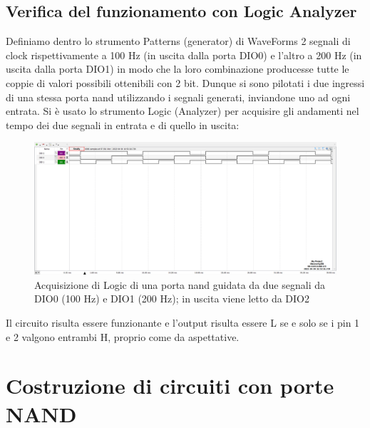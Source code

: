 \documentclass[10pt, a4paper, italian]{article}
\begin{document}
\subsection{Verifica del funzionamento con Logic Analyzer}
Definiamo dentro lo strumento Patterns (generator) di WaveForms 2 segnali
di clock rispettivamente a 100 Hz (in uscita dalla porta DIO0) e l'altro a 200 Hz (in uscita dalla porta DIO1) in modo che la loro combinazione producesse tutte le coppie di valori possibili ottenibili con 2 bit.
Dunque si sono pilotati i due ingressi di una stessa porta nand utilizzando i segnali generati, inviandone uno ad ogni entrata.
Si è usato lo strumento Logic (Analyzer) per acquisire gli andamenti nel tempo dei due segnali in entrata e di quello in uscita:
\begin{figure}[htbp]
\centering
	\includegraphics[scale=0.4]{nand_time}
	\caption{Acquisizione di Logic di una porta nand guidata da due segnali da
	DIO0 (100 Hz) e DIO1 (200 Hz); in uscita viene letto da DIO2}
	\label{nand_time}
\end{figure}
Il circuito risulta essere funzionante e l'output risulta essere L se e solo
se i pin 1 e 2 valgono entrambi H, proprio come da aspettative.

\section{Costruzione di circuiti con porte NAND}
\end{document}
